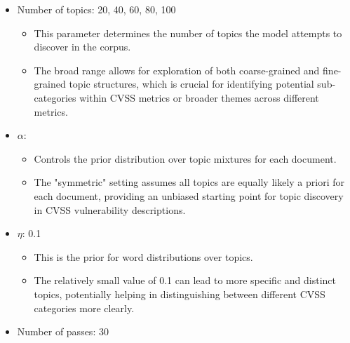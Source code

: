 \documentclass[12pt]{article}
\begin{document}
\begin{itemize}

	\item Number of topics: {20, 40, 60, 80, 100}

	      \begin{itemize}

		      \item This parameter determines the number of topics the model attempts to discover in
		            the corpus.

		      \item The broad range allows for exploration of both coarse-grained and fine-grained
		            topic structures, which is crucial for identifying potential sub-categories within
		            CVSS metrics or broader themes across different metrics.

	      \end{itemize}

	\item $\alpha$: {}

	      \begin{itemize}

		      \item Controls the prior distribution over topic mixtures for each document.

		      \item The "symmetric" setting assumes all topics are equally likely a priori for each
		            document, providing an unbiased starting point for topic discovery in CVSS
		            vulnerability descriptions.

	      \end{itemize}

	\item $\eta$: {0.1}

	      \begin{itemize}

		      \item This is the prior for word distributions over topics.

		      \item The relatively small value of 0.1 can lead to more specific and distinct topics,
		            potentially helping in distinguishing between different CVSS categories more
		            clearly.

	      \end{itemize}

	\item Number of passes: {30}


\end{itemize}
\end{document}
